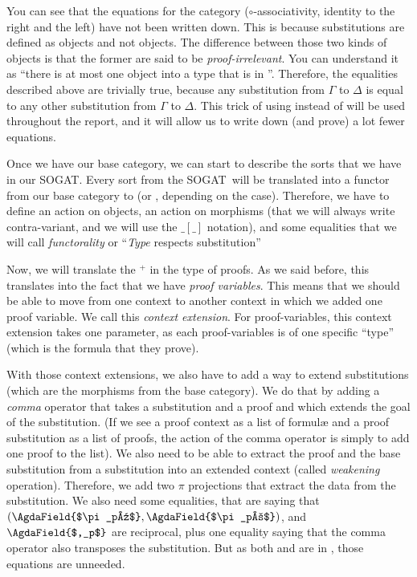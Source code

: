 \documentclass[10pt,a4paper]{article}
\begin{document}
			You can see that the equations for the category ($\circ$-associativity, identity to the right and the left) have not been written down. This is because substitutions are defined as \Prop{} objects and not \Set{} objects. The difference between those two kinds of objects is that the former are said to be \emph{proof-irrelevant}. You can understand it as \enquote{there is at most one object into a type that is in \Prop}. Therefore, the equalities described above are trivially true, because any substitution from $\Gamma$ to $\Delta$ is equal to any other substitution from $\Gamma$ to $\Delta$. This trick of using \Prop{} instead of \Set{} will be used throughout the report, and it will allow us to write down (and prove) a lot fewer equations.
			
			\begin{tcolorbox}
			\end{tcolorbox}
		
			Once we have our base category, we can start to describe the sorts that we have in our SOGAT. Every sort from the SOGAT will be translated into a functor from our base category to \Set{} (or \Prop{}, depending on the case). Therefore, we have to define an action on objects, an action on morphisms (that we will always write contra-variant, and we will use the $\_[\_]$ notation), and some equalities that we will call \emph{functorality} or \enquote{\textit{Type} respects substitution}
			
			\begin{tcolorbox}
				\agda{agda/ZOL-3.tex}
				\agdasep
				\agda{agda/ZOL-4.tex}
			\end{tcolorbox}
		
			Now, we will translate the ${}^+$ in the type of proofs. As we said before, this translates into the fact that we have \emph{proof variables}. This means that we should be able to move from one context to another context in which we added one proof variable. We call this \emph{context extension}. For proof-variables, this context extension takes one parameter, as each proof-variables is of one specific \enquote{type} (which is the formula that they prove).
			
			With those context extensions, we also have to add a way to extend substitutions (which are the morphisms from the base category). We do that by adding a \emph{comma} operator that takes a substitution and a proof and which extends the goal of the substitution. (If we see a proof context as a list of formulæ and a proof substitution as a list of proofs, the action of the comma operator is simply to add one proof to the list). We also need to be able to extract the proof and the base substitution from a substitution into an extended context (called \emph{weakening} operation). Therefore, we add two $\pi$ projections that extract the data from the substitution. We also need some equalities, that are saying that $(\AgdaField{$\pi_p¹$} , \AgdaField{$\pi_p²$})$, and $\AgdaField{$,_p$}$ are reciprocal, plus one equality saying that the comma operator also transposes the substitution. But as both  and  are in \Prop{}, those equations are unneeded.
			
\end{document}
